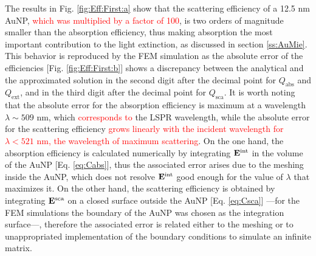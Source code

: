 The results in Fig. \ref{fig:Eff:First:a} show that the scattering efficiency of a 12.5 nm AuNP, \textcolor{red}{which was multiplied by a factor of 100}, is two orders of magnitude smaller than the absorption efficiency, thus making absorption the most important contribution to the light extinction, as discussed in section \ref{ss:AuMie}. This behavior is reproduced by the FEM simulation as the absolute error of the efficiencies [Fig. \ref{fig:Eff:First:b}] shows a discrepancy between the analytical and the approximated solution in the second digit after the decimal point for $Q_\text{abs}$ and $Q_\text{ext}$, and in the third digit after the decimal point for $Q_\text{sca}$. It is worth noting that the absolute error for the absorption efficiency is maximum at a wavelength $\lambda\sim 509$ nm, which \textcolor{red}{corresponds to} the LSPR wavelength, while the absolute error for the scattering efficiency \textcolor{red}{grows linearly with the incident wavelength for $\lambda < 521$ nm, the wavelength of maximum scattering}. On the one hand, the absorption efficiency is calculated numerically by integrating $\vb{E}^\text{int}$ in the volume of the AuNP [Eq. \eqref{eq:Cabs}], thus the associated error arises due to the meshing inside the AuNP, which does not resolve $\vb{E}^\text{int}$ good enough for the value of $\lambda$ that maximizes it. On the other hand, the scattering efficiency is obtained by integrating $\vb{E}^\text{sca}$ on a closed surface outside the AuNP [Eq. \eqref{eq:Csca}] ---for the FEM simulations the boundary of the AuNP was chosen as the integration surface---, therefore the associated error is related either to the meshing or to unappropriated implementation of the boundary conditions to simulate an infinite matrix.

